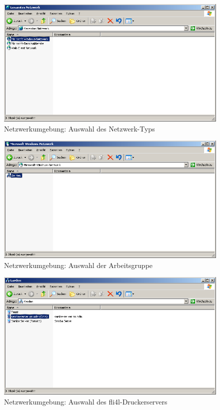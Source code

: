 \begin{figure}[hbt!]
\centering
\includegraphics[width=\columnwidth]{image003}
\caption{Netzwerkumgebung: Auswahl des Netzwerk-Typs}
\label{fig:sambalpd:networking-environment:2}
\end{figure}

\begin{figure}[hbt!]
\centering
\includegraphics[width=\columnwidth]{image004}
\caption{Netzwerkumgebung: Auswahl der Arbeitsgruppe}
\label{fig:sambalpd:networking-environment:3}
\end{figure}

\begin{figure}[hbt!]
\centering
\includegraphics[width=\columnwidth]{image005}
\caption{Netzwerkumgebung: Auswahl des fli4l-Druckerservers}
\label{fig:sambalpd:networking-environment:4}
\end{figure}

